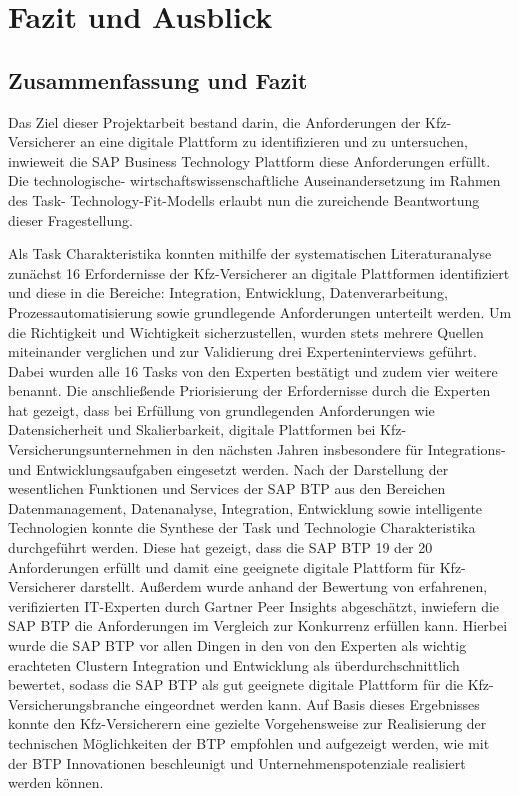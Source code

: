 \chapter{Fazit und Ausblick}

\section{Zusammenfassung und Fazit}

Das Ziel dieser Projektarbeit bestand darin, die Anforderungen der Kfz-Versicherer an eine digitale Plattform zu identifizieren und zu untersuchen, inwieweit die SAP Business Technology Plattform diese Anforderungen erfüllt. Die technologische- wirtschaftswissenschaftliche Auseinandersetzung im Rahmen des Task- Technology-Fit-Modells erlaubt nun die zureichende Beantwortung dieser Fragestellung.

Als Task Charakteristika konnten mithilfe der systematischen Literaturanalyse zunächst 16 Erfordernisse der Kfz-Versicherer an digitale Plattformen identifiziert und diese in die Bereiche: Integration, Entwicklung, Datenverarbeitung, Prozessautomatisierung sowie grundlegende Anforderungen unterteilt werden. Um die Richtigkeit und Wichtigkeit sicherzustellen, wurden stets mehrere Quellen miteinander verglichen und zur Validierung drei Experteninterviews geführt. Dabei wurden alle 16 Tasks von den Experten bestätigt und zudem vier weitere benannt. Die anschließende Priorisierung der Erfordernisse durch die Experten hat gezeigt, dass bei Erfüllung von grundlegenden Anforderungen wie Datensicherheit und Skalierbarkeit, digitale Plattformen bei Kfz-Versicherungsunternehmen in den nächsten Jahren insbesondere für Integrations- und Entwicklungsaufgaben eingesetzt werden. Nach der Darstellung der wesentlichen Funktionen und Services der SAP BTP aus den Bereichen Datenmanagement, Datenanalyse, Integration, Entwicklung sowie intelligente Technologien konnte die Synthese der Task und Technologie Charakteristika durchgeführt werden. Diese hat gezeigt, dass die SAP BTP 19 der 20 Anforderungen erfüllt und damit eine geeignete digitale Plattform für Kfz-Versicherer darstellt. Außerdem wurde anhand der Bewertung von erfahrenen, verifizierten IT-Experten durch Gartner Peer Insights abgeschätzt, inwiefern die SAP BTP die Anforderungen im Vergleich zur Konkurrenz erfüllen kann. Hierbei wurde die SAP BTP vor allen Dingen in den von den Experten als wichtig erachteten Clustern Integration und Entwicklung als überdurchschnittlich bewertet, sodass die SAP BTP als gut geeignete digitale Plattform für die Kfz-Versicherungsbranche eingeordnet werden kann. Auf Basis dieses Ergebnisses konnte den Kfz-Versicherern eine gezielte Vorgehensweise zur Realisierung der technischen Möglichkeiten der BTP empfohlen und aufgezeigt werden, wie mit der BTP Innovationen beschleunigt und Unternehmenspotenziale realisiert werden können.

